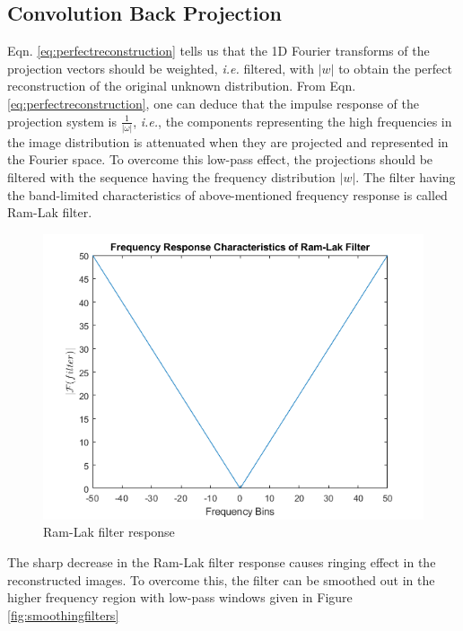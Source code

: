 \documentclass[journal]{IEEEtran}
\begin{document}
\subsection{Convolution Back Projection} \label{subsec:convback}
Eqn. \ref{eq:perfectreconstruction} tells us that the 1D Fourier transforms of the projection vectors should be weighted, \textit{i.e.} filtered, with $|w|$ to obtain the perfect reconstruction of the original unknown distribution. From Eqn. \ref{eq:perfectreconstruction}, one can deduce that the impulse response of the projection system is $\frac{1}{|\omega|}$, \textit{i.e.}, the components representing the high frequencies in the image distribution is attenuated when they are projected and represented in the Fourier space. 
\vfill{\null}
To overcome this low-pass effect, the projections should be filtered with the sequence having the frequency distribution $|w|$. The filter having the band-limited characteristics of above-mentioned frequency response is called Ram-Lak filter.

\begin{figure}[h]
	\centering
	\includegraphics[width=.8\columnwidth]{images/ramlak.png}
	\caption{Ram-Lak filter response}\label{fig:barthannresp}
	\end{figure}

The sharp decrease in the Ram-Lak filter response causes ringing effect in the reconstructed images. To overcome this, the filter can be smoothed out in the higher frequency region with low-pass windows given in Figure \ref{fig:smoothingfilters}
\end{document}
